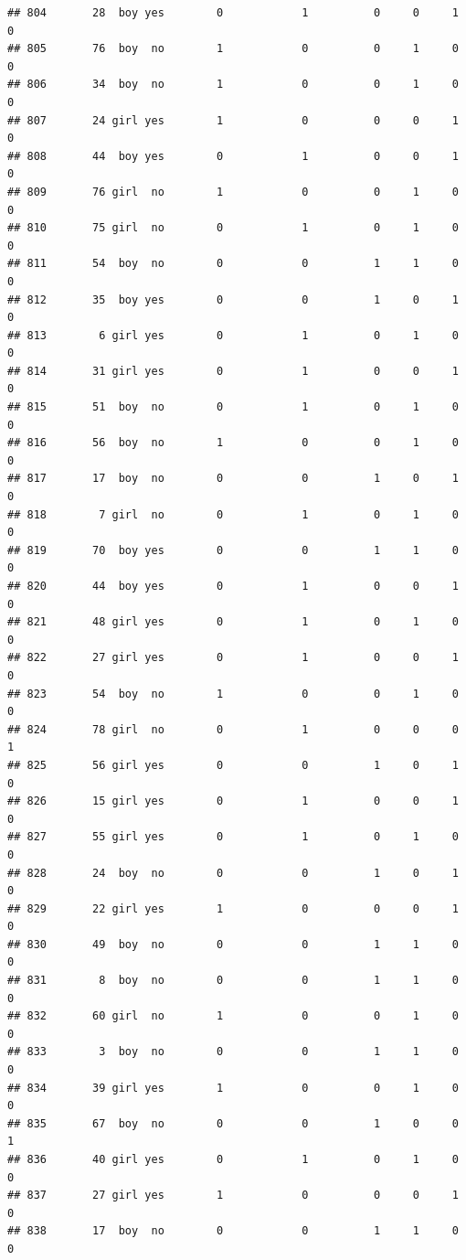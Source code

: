 \documentclass[man]{apa6}
\begin{document}
\begin{verbatim}
## 804       28  boy yes        0            1          0     0     1     0
## 805       76  boy  no        1            0          0     1     0     0
## 806       34  boy  no        1            0          0     1     0     0
## 807       24 girl yes        1            0          0     0     1     0
## 808       44  boy yes        0            1          0     0     1     0
## 809       76 girl  no        1            0          0     1     0     0
## 810       75 girl  no        0            1          0     1     0     0
## 811       54  boy  no        0            0          1     1     0     0
## 812       35  boy yes        0            0          1     0     1     0
## 813        6 girl yes        0            1          0     1     0     0
## 814       31 girl yes        0            1          0     0     1     0
## 815       51  boy  no        0            1          0     1     0     0
## 816       56  boy  no        1            0          0     1     0     0
## 817       17  boy  no        0            0          1     0     1     0
## 818        7 girl  no        0            1          0     1     0     0
## 819       70  boy yes        0            0          1     1     0     0
## 820       44  boy yes        0            1          0     0     1     0
## 821       48 girl yes        0            1          0     1     0     0
## 822       27 girl yes        0            1          0     0     1     0
## 823       54  boy  no        1            0          0     1     0     0
## 824       78 girl  no        0            1          0     0     0     1
## 825       56 girl yes        0            0          1     0     1     0
## 826       15 girl yes        0            1          0     0     1     0
## 827       55 girl yes        0            1          0     1     0     0
## 828       24  boy  no        0            0          1     0     1     0
## 829       22 girl yes        1            0          0     0     1     0
## 830       49  boy  no        0            0          1     1     0     0
## 831        8  boy  no        0            0          1     1     0     0
## 832       60 girl  no        1            0          0     1     0     0
## 833        3  boy  no        0            0          1     1     0     0
## 834       39 girl yes        1            0          0     1     0     0
## 835       67  boy  no        0            0          1     0     0     1
## 836       40 girl yes        0            1          0     1     0     0
## 837       27 girl yes        1            0          0     0     1     0
## 838       17  boy  no        0            0          1     1     0     0

\end{verbatim}
\end{document}
